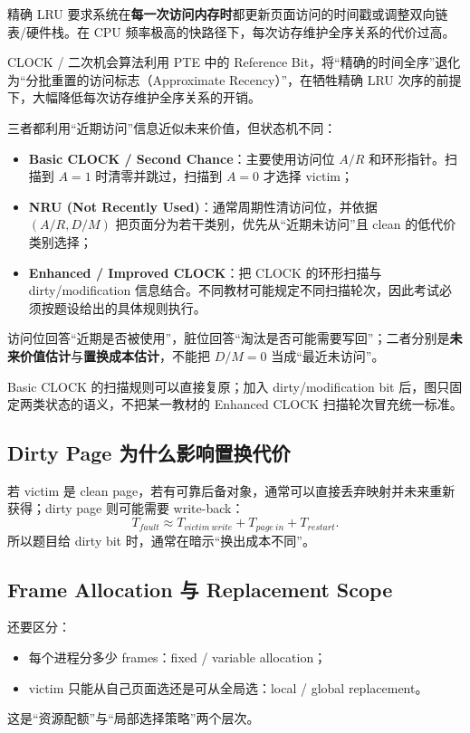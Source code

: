 \documentclass[11pt,a4paper]{ctexart}
\newcommand{\kw}[1]{\textbf{#1}}
\begin{document}
\begin{method}
精确 LRU 要求系统在\kw{每一次访问内存时}都更新页面访问的时间戳或调整双向链表/硬件栈。在 CPU 频率极高的快路径下，每次访存维护全序关系的代价过高。

CLOCK / 二次机会算法利用 PTE 中的 Reference Bit，将“精确的时间全序”退化为“分批重置的访问标志（Approximate Recency）”，在牺牲精确 LRU 次序的前提下，大幅降低每次访存维护全序关系的开销。
\end{method}

\begin{method}
三者都利用“近期访问”信息近似未来价值，但状态机不同：
\begin{itemize}
  \item \kw{Basic CLOCK / Second Chance}：主要使用访问位 $A/R$ 和环形指针。扫描到 $A=1$ 时清零并跳过，扫描到 $A=0$ 才选择 victim；
  \item \kw{NRU (Not Recently Used)}：通常周期性清访问位，并依据 $(A/R,D/M)$ 把页面分为若干类别，优先从“近期未访问”且 clean 的低代价类别选择；
  \item \kw{Enhanced / Improved CLOCK}：把 CLOCK 的环形扫描与 dirty/modification 信息结合。不同教材可能规定不同扫描轮次，因此考试必须按题设给出的具体规则执行。
\end{itemize}
访问位回答“近期是否被使用”，脏位回答“淘汰是否可能需要写回”；二者分别是\kw{未来价值估计}与\kw{置换成本估计}，不能把 $D/M=0$ 当成“最近未访问”。
\end{method}

\begin{center}
\resizebox{0.96\linewidth}{!}{}
\end{center}
Basic CLOCK 的扫描规则可以直接复原；加入 dirty/modification bit 后，图只固定两类状态的语义，不把某一教材的 Enhanced CLOCK 扫描轮次冒充统一标准。

\subsection{Dirty Page 为什么影响置换代价}
若 victim 是 clean page，若有可靠后备对象，通常可以直接丢弃映射并未来重新获得；dirty page 则可能需要 write-back：
\[
T_{fault}\approx T_{victim\ write}+T_{page\ in}+T_{restart}.
\]
所以题目给 dirty bit 时，通常在暗示“换出成本不同”。

\subsection{Frame Allocation 与 Replacement Scope}
还要区分：
\begin{itemize}
  \item 每个进程分多少 frames：fixed / variable allocation；
  \item victim 只能从自己页面选还是可从全局选：local / global replacement。
\end{itemize}
这是“资源配额”与“局部选择策略”两个层次。
\end{document}
